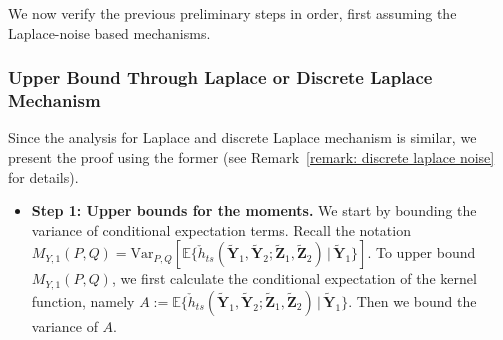 \documentclass[twoside,11pt]{article}
\newcommand{\rvTwo}{Y}
\newcommand{\vectorize}[1]{\mathbf{#1}}
\newcommand{\vecRandomPrivTwoSampleYNumber}[1]{\tilde{\mathbf{Y}}_{#1}}
\newcommand{\mE}{\mathbb{E}} %
\newcommand{\mVPQ}{\mathrm{Var}_{P,Q}} %
\newcommand{\kernelMoment}{M} %
\newcommand{\dataGenDist}{P}  %
\newcommand{\privacyMechanism}{Q}
\newcommand{\momentTwosampleVarCondexpY}{\kernelMoment_{\rvTwo,1}(\dataGenDist, \privacyMechanism)}
\newcommand{\vecRandomPrivTwoSampleZNumber}[1]{\tilde{\mathbf{Z}}_{#1}}
\newcommand{\kernelTwoSampleSym}{\check{h}_{ts}}
\begin{document}
\begin{appendix}
	We now verify the previous preliminary steps in order, first assuming the Laplace-noise based mechanisms.
	
	\subsubsection{Upper Bound Through Laplace or Discrete Laplace Mechanism}\label{proof:multinomial_upper_bound_first_moment}
	Since the analysis for Laplace and discrete Laplace mechanism is similar, we present the proof using the former (see Remark~\ref{remark: discrete laplace noise} for details).
	

	\begin{itemize}
	\item \textbf{Step 1: Upper bounds for the moments.}
	We start by bounding the variance of conditional expectation terms.
	Recall the notation
	$
	\momentTwosampleVarCondexpY
	=
	\mVPQ[\mE\{ \kernelTwoSampleSym(
	\tilde{\vectorize{\rvTwo}}_1,
	\vecRandomPrivTwoSampleYNumber{2}
	;
	\vecRandomPrivTwoSampleZNumber{1},
	\vecRandomPrivTwoSampleZNumber{2}
	)
	\,|\,
	\tilde{\vectorize{\rvTwo}}_1
	\}]$.
	To upper bound $\momentTwosampleVarCondexpY$, we first calculate the conditional expectation of the kernel function, namely
	$A:=\mE\{ \kernelTwoSampleSym(
	\tilde{\vectorize{\rvTwo}}_1,
	\vecRandomPrivTwoSampleYNumber{2}
	;
	\vecRandomPrivTwoSampleZNumber{1},
	\vecRandomPrivTwoSampleZNumber{2}
	)
	\,|\,
	\tilde{\vectorize{\rvTwo}}_1
	\}$.
	Then we  bound the variance of $A$.
	\\
	

\end{itemize}
\end{appendix}
\end{document}
